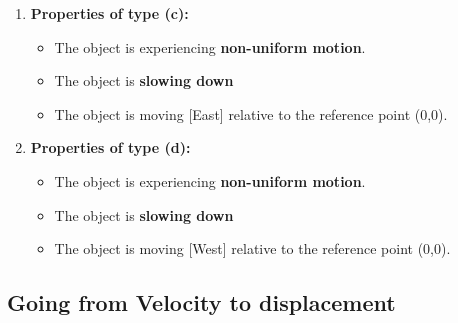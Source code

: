 \documentclass[12pt]{article}
\newcommand{\tx}[1]{\text{#1}}
\theoremstyle{break}
\begin{document}
\begin{enumerate}[label = (\alph*)]
	\item 

		\textbf{\large{Properties of type (c):}}
		\begin{itemize}
			\item The object is experiencing \textbf{non-uniform motion}.
			\item The object is \textbf{slowing down}
			\item The object is moving [East] relative to the reference point (0,0).
		\end{itemize}

	\item 

		\textbf{\large{Properties of type (d):}}
		\begin{itemize}
			\item The object is experiencing \textbf{non-uniform motion}.
			\item The object is \textbf{slowing down}
			\item The object is moving [West] relative to the reference point (0,0).
		\end{itemize}

\end{enumerate}

\newpage
\subsection{Going from Velocity to displacement}




	
\end{document}
